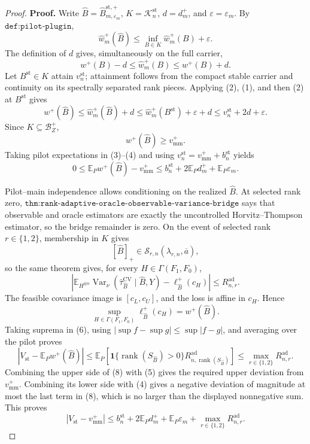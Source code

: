 \documentclass{article}
\begin{document}
\begin{proof}
\textbf{Proof.}
Write \(\widehat B=\widehat B_{m,\varepsilon_m}^{\mathrm{st},+}\), \(K=\mathcal K_n^{\mathrm{st}}\), \(d=d_m^+\), and \(\varepsilon=\varepsilon_m\).  By \(\texttt{def:pilot-plugin}\),
\[
\widehat w_m^+(\widehat B)
\le\inf_{B\in K}\widehat w_m^+(B)+\varepsilon.
\tag{1}
\]
The definition of \(d\) gives, simultaneously on the full carrier,
\[
w^+(B)-d\le\widehat w_m^+(B)\le w^+(B)+d.
\tag{2}
\]
Let \(B^{\mathrm{st}}\in K\) attain \(v_n^{\mathrm{st}}\); attainment follows from the compact stable carrier and continuity on its spectrally separated rank pieces.  Applying (2), (1), and then (2) at \(B^{\mathrm{st}}\) gives
\[
w^+(\widehat B)
\le\widehat w_m^+(\widehat B)+d
\le\widehat w_m^+(B^{\mathrm{st}})+\varepsilon+d
\le v_n^{\mathrm{st}}+2d+\varepsilon.
\tag{3}
\]
Since \(K\subseteq\mathcal B_Z^+\),
\[
w^+(\widehat B)\ge v_{\mathrm{mm}}^+.
\tag{4}
\]
Taking pilot expectations in (3)--(4) and using \(v_n^{\mathrm{st}}=v_{\mathrm{mm}}^++b_n^{\mathrm{st}}\) yields
\[
0\le\mathbb E_Pw^+(\widehat B)-v_{\mathrm{mm}}^+
\le b_n^{\mathrm{st}}+2\mathbb E_Pd_m^++\mathbb E_P\varepsilon_m.
\tag{5}
\]

Pilot--main independence allows conditioning on the realized \(\widehat B\).  At selected rank zero, \(\texttt{thm:rank-adaptive-oracle-observable-variance-bridge}\) says that observable and oracle estimators are exactly the uncontrolled Horvitz--Thompson estimator, so the bridge remainder is zero.  On the event of selected rank \(r\in\{1,2\}\), membership in \(K\) gives
\[
[\widehat B]_+\in\mathcal S_{r,n}(\lambda_{r,n},\overline a),
\]
so the same theorem gives, for every \(H\in\Gamma(F_1,F_0)\),
\[
\left|
\mathbb E_{H^{\otimes n}}
\operatorname{Var}_\nu(\widehat\tau_{\widehat B}^{\mathrm{CV}}\mid\widehat B,Y)
-\ell_{\widehat B}^+(c_H)\right|
\le R_{n,r}^{\mathrm{ad}}.
\tag{6}
\]
The feasible covariance image is \([c_L,c_U]\), and the loss is affine in \(c_H\).  Hence
\[
\sup_{H\in\Gamma(F_1,F_0)}\ell_{\widehat B}^+(c_H)
=w^+(\widehat B).
\tag{7}
\]
Taking suprema in (6), using \(|\sup f-\sup g|\le\sup|f-g|\), and averaging over the pilot proves
\[
\left|V_{\mathrm{st}}-\mathbb E_Pw^+(\widehat B)\right|
\le\mathbb E_P\!\left[
\mathbf1\{\operatorname{rank}(S_{\widehat B})>0\}
R_{n,\operatorname{rank}(S_{\widehat B})}^{\mathrm{ad}}\right]
\le\max_{r\in\{1,2\}}R_{n,r}^{\mathrm{ad}}.
\tag{8}
\]
Combining the upper side of (8) with (5) gives the required upper deviation from \(v_{\mathrm{mm}}^+\).  Combining its lower side with (4) gives a negative deviation of magnitude at most the last term in (8), which is no larger than the displayed nonnegative sum.  This proves
\[
\left|V_{\mathrm{st}}-v_{\mathrm{mm}}^+\right|
\le b_n^{\mathrm{st}}+2\mathbb E_Pd_m^+
+\mathbb E_P\varepsilon_m
+\max_{r\in\{1,2\}}R_{n,r}^{\mathrm{ad}}.
\tag{9}
\]


\end{proof}
\end{document}
